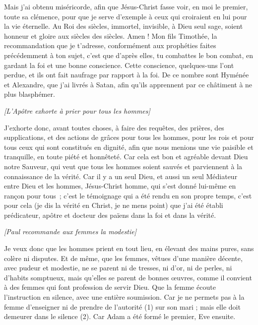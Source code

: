 \begin{multicols}{2}
Mais j'ai obtenu miséricorde, afin que Jésus-Christ fasse voir, en moi le premier, toute sa clémence, pour que je serve d'exemple à ceux qui croiraient en lui pour la vie éternelle.
Au Roi des siècles, immortel, invisible, à Dieu seul sage, soient honneur et gloire aux siècles des siècles. Amen !
Mon fils Timothée, la recommandation que je t’adresse, conformément aux prophéties faites précédemment à ton sujet, c’est que d’après elles, tu combattes le bon combat,
en gardant la foi et une bonne conscience. Cette conscience, quelques-uns l’ont perdue, et ils ont fait naufrage par rapport à la foi.
De ce nombre sont Hyménée et Alexandre, que j'ai livrés à Satan, afin qu'ils apprennent par ce châtiment à ne plus blasphémer.
\begin{center}
\textit{[L'Apôtre exhorte à prier pour tous les hommes]}
\end{center}
\VerseOne{}J'exhorte donc, avant toutes choses, à faire des requêtes, des prières, des supplications, et des actions de grâces pour tous les hommes,
pour les rois et pour tous ceux qui sont constitués en dignité, afin que nous menions une vie paisible et tranquille, en toute piété et honnêteté.
Car cela est bon et agréable devant Dieu notre Sauveur,
qui veut que tous les hommes soient sauvés et parviennent à la connaissance de la vérité.
Car il y a un seul Dieu, et aussi un seul Médiateur entre Dieu et les hommes, Jésus-Christ homme,
qui s'est donné lui-même en rançon pour tous ; c’est le témoignage qui a été rendu en son propre temps,
c'est pour cela (je dis la vérité en Christ, je ne mens point) que j'ai été établi prédicateur, apôtre et docteur des païens dans la foi et dans la vérité.
\begin{center}
\textit{[Paul recommande aux femmes la modestie]}
\end{center}
\PPE{}
Je veux donc que les hommes prient en tout lieu, en élevant des mains pures, sans colère ni disputes.
Et de même, que les femmes, vêtues d’une manière décente, avec pudeur et modestie, ne se parent ni de tresses, ni d’or, ni de perles, ni d’habits somptueux,
mais qu'elles se parent de bonnes œuvres, comme il convient à des femmes qui font profession de servir Dieu.
Que la femme écoute l’instruction en silence, avec une entière soumission.
Car je ne permets pas à la femme d'enseigner ni de prendre de l’autorité (1) sur son mari ; mais elle doit demeurer dans le silence (2).
Car Adam a été formé le premier, Eve ensuite.

\end{multicols}
